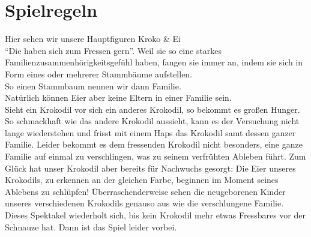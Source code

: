 \documentclass{scrartcl}
\begin{document}
	\section{Spielregeln} 
	Hier sehen wir unsere Hauptfiguren Kroko \& Ei\\
	"`Die haben sich zum Fressen gern"'.
	Weil sie so eine starkes Familienzusammenhörigkeitsgefühl haben, fangen sie immer an, indem sie sich in Form eines oder mehrerer Stammbäume aufstellen.\\
	So einen Stammbaum nennen wir dann Familie.\\
	Natürlich können Eier aber keine Eltern in einer Familie sein.\\
	Sieht ein Krokodil vor sich ein anderes Krokodil, so bekommt es großen Hunger. So schmackhaft wie das andere Krokodil aussieht, kann es der Versuchung nicht lange wiederstehen und frisst mit einem Haps das Krokodil samt dessen ganzer Familie. 	
	Leider bekommt es dem fressenden Krokodil nicht besonders, eine ganze Familie auf einmal zu verschlingen, was zu seinem verfrühten Ableben führt.
	Zum Glück hat unser Krokodil aber bereits für Nachwuchs gesorgt: Die Eier unseres Krokodils, zu erkennen an der gleichen Farbe, beginnen im Moment seines Ablebens zu schlüpfen!
	Überraschenderweise sehen die neugeborenen Kinder unseres verschiedenen Krokodils genauso aus wie die verschlungene Familie. 
	Dieses Spektakel wiederholt sich, bis kein Krokodil mehr etwas Fressbares vor der Schnauze hat.
	Dann ist das Spiel leider vorbei.\\
\end{document}
